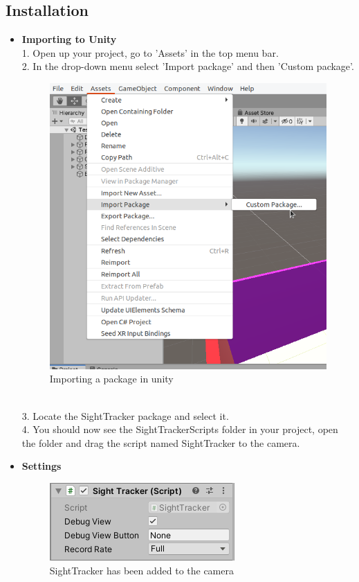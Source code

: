 \documentclass[letterpaper]{article}
\begin{document}
\subsection{Installation}
\begin{itemize}
\item \textbf{Importing to Unity}\\
1. Open up your project, go to 'Assets' in the top menu bar.\\[0.15in]
2. In the drop-down menu select 'Import package' and then 'Custom package'.
\begin{figure}[h!]
  \centering \includegraphics[keepaspectratio,scale=0.8]{ImportPackage.png}
  \caption{Importing a package in unity}
  \label{fig:unityimport}
\end{figure}
\\3. Locate the SightTracker package and select it.\\[0.15in]
4. You should now see the SightTrackerScripts folder in your project, open the folder and drag the script named SightTracker to the camera.\\
\item \textbf{Settings}\\
\begin{figure}[h!]
  \centering \includegraphics[keepaspectratio,scale=0.9]{SightTracker.png}
  \caption{SightTracker has been added to the camera}
  \label{fig:loadedtocamera}
\end{figure}


\end{itemize}
\end{document}
